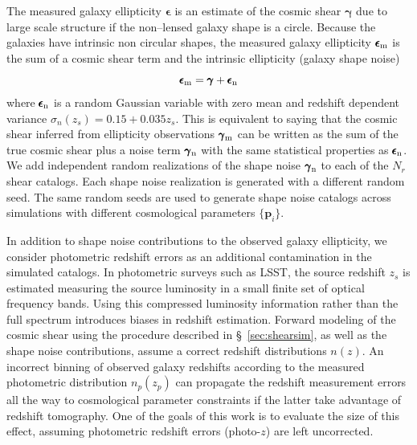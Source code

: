 \documentclass[reprint,aps,prd,superscriptaddress,showkeys,showpacs]{revtex4-1}
\newcommand{\bb}[1]{\mathbf{#1}}
\begin{document}
The measured galaxy ellipticity $\pmb{\epsilon}$ is an estimate of the cosmic shear $\pmb{\gamma}$ due to large scale structure if the non--lensed galaxy shape is a circle. Because the galaxies have intrinsic non circular shapes, the measured galaxy ellipticity $\pmb{\epsilon}_{\rm m}$ is the sum of a cosmic shear term and the intrinsic ellipticity (galaxy shape noise) \citep{wlreview}
\begin{equation}
\pmb{\epsilon}_{\rm m} = \pmb{\gamma} + \pmb{\epsilon}_{\rm n}
\end{equation} 
%
where $\pmb{\epsilon}_{\rm n}$ is a random Gaussian variable with zero mean and redshift dependent variance $\sigma_n(z_s)=0.15+0.035z_s$. This is equivalent to saying that the cosmic shear inferred from ellipticity observations $\pmb{\gamma}_{\rm m}$ can be written as the sum of the true cosmic shear plus a noise term $\pmb{\gamma}_{\rm n}$ with the same statistical properties as $\pmb{\epsilon}_{\rm n}$. 
We add independent random realizations of the shape noise $\pmb{\gamma}_{\rm n}$ to each of the $N_r$ shear catalogs. Each shape noise realization is generated with a different random seed. The same random seeds are used to generate shape noise catalogs across simulations with different cosmological parameters $\{\bb{p}_i\}$.

In addition to shape noise contributions to the observed galaxy ellipticity, we consider photometric redshift errors as an additional contamination in the simulated catalogs. In photometric surveys such as LSST, the source redshift $z_s$ is estimated measuring the source luminosity in a small finite set of optical frequency bands. Using this compressed luminosity information rather than the full spectrum introduces biases in redshift estimation. Forward modeling of the cosmic shear using the procedure described in \S~\ref{sec:shearsim}, as well as the shape noise contributions, assume a correct redshift distributions $n(z)$. An incorrect binning of observed galaxy redshifts according to the measured photometric distribution $n_p(z_p)$ can propagate the redshift measurement errors all the way to cosmological parameter constraints if the latter take advantage of redshift tomography. One of the goals of this work is to evaluate the size of this effect, assuming photometric redshift errors (photo-$z$) are left uncorrected. 
\end{document}
